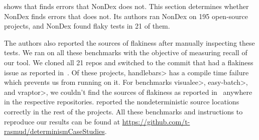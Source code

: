  shows that \theDeterminismChecker finds errors that NonDex does not.
This section determines whether NonDex finds errors that \theDeterminismChecker does not.
Its authors ran NonDex on 195 open-source projects, and NonDex found flaky tests in
21 of them.


The authors also reported the sources of flakiness
after manually inspecting these tests. We ran \TheDeterminismChecker on all these benchmarks with the objective
of measuring recall of our tool. We cloned all 21 repos and switched to the commit that had a flakiness issue as reported 
in~\cite{nondex}. Of these projects, \<handlebars> has a compile time failure which prevents us from running \TheDeterminismChecker on it. For benchmarks \<visualee>, \<easy-batch>, and \<vraptor>, we couldn't find
the sources of flakiness as reported in~\cite{nondex} anywhere in the respective repositories.
\TheDeterminismChecker reported the nondeterministic source locations correctly in the rest of the projects.
All these benchmarks and instructions to reproduce our results can be found at \href{https://github.com/t-rasmud/determinismCaseStudies}{https://github.com/t-rasmud/determinismCaseStudies}.

